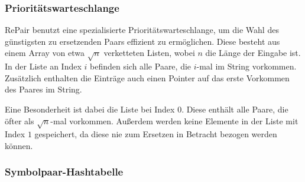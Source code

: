 \subsubsection{Prioritätswarteschlange}

RePair benutzt eine spezialisierte Prioritätswarteschlange, um die Wahl des günstigsten zu ersetzenden Paars effizient zu ermöglichen. Diese besteht aus einem Array von etwa $\sqrt{n}$ verketteten Listen, wobei $n$ die Länge der Eingabe ist. In der Liste an Index $i$ befinden sich alle Paare, die $i$-mal im String vorkommen. Zusätzlich enthalten die Einträge auch  einen Pointer auf das erste Vorkommen des Paares im String.

Eine Besonderheit ist dabei die Liste bei Index $0$. Diese enthält alle Paare, die öfter als $\sqrt{n}$-mal vorkommen. Außerdem werden keine Elemente in der Liste mit Index $1$ gespeichert, da diese nie zum Ersetzen in Betracht bezogen werden können.
 
\subsubsection{Symbolpaar-Hashtabelle}

